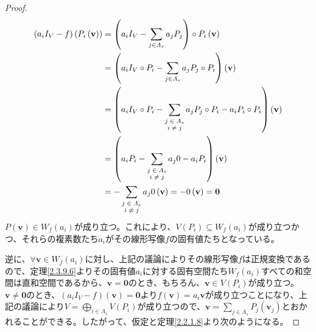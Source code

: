\documentclass[dvipdfmx]{jsarticle}
\begin{document}
\begin{proof}
\begin{align*}
\left( a_{i}I_{V} - f \right)\left( P_{i}\left( \mathbf{v} \right) \right) &= \left( a_{i}I_{V} - \sum_{j \in \varLambda_{s}} {a_{j}P_{j}} \right) \circ P_{i}\left( \mathbf{v} \right)\\
&= \left( a_{i}I_{V} \circ P_{i} - \sum_{j \in \varLambda_{s}} {a_{j}P_{j} \circ P_{i}} \right)\left( \mathbf{v} \right)\\
&= \left( a_{i}I_{V} \circ P_{i} - \sum_{\scriptsize \begin{matrix} j \in \varLambda_{s} \\i \neq j \\\end{matrix}} {a_{j}P_{j} \circ P_{i}} - a_{i}P_{i} \circ P_{i} \right)\left( \mathbf{v} \right)\\
&= \left( a_{i}P_{i} - \sum_{\scriptsize \begin{matrix} j \in \varLambda_{s} \\i \neq j \\\end{matrix}} {a_{j}0} - a_{i}P_{i} \right)\left( \mathbf{v} \right)\\
&= - \sum_{\scriptsize \begin{matrix} j \in \varLambda_{s} \\i \neq j \\\end{matrix}} {a_{j}0}\left( \mathbf{v} \right) = - 0\left( \mathbf{v} \right) = \mathbf{0}
\end{align*}
$P\left( \mathbf{v} \right) \in W_{f}\left( a_{i} \right)$が成り立つ。これにより、$V\left( P_{i} \right) \subseteq W_{f}\left( a_{i} \right)$が成り立つかつ、それらの複素数たち$a_{i}$がその線形写像$f$の固有値たちとなっている。\par
逆に、$\forall\mathbf{v} \in W_{f}\left( a_{i} \right)$に対し、上記の議論によりその線形写像$f$は正規変換であるので、定理\ref{2.3.9.6}よりその固有値$a_{i}$に対する固有空間たち$W_{f}\left( a_{i} \right)$すべての和空間は直和空間であるから、$\mathbf{v} = \mathbf{0}$のとき、もちろん、$\mathbf{v} \in V\left( P_{i} \right)$が成り立つ。$\mathbf{v} \neq \mathbf{0}$のとき、$\left( a_{i}I_{V} - f \right)\left( \mathbf{v} \right) = \mathbf{0}$より$f\left( \mathbf{v} \right) = a_{i}\mathbf{v}$が成り立つことになり、上記の議論により$V = \bigoplus_{i \in \varLambda_{s}} {V\left( P_{i} \right)}$が成り立つので、$\mathbf{v} = \sum_{j \in \varLambda_{s}} {P_{j}\left( \mathbf{v}_{j} \right)}$とおかれることができる。したがって、仮定と定理\ref{2.2.1.8}より次のようになる。

\end{proof}
\end{document}
